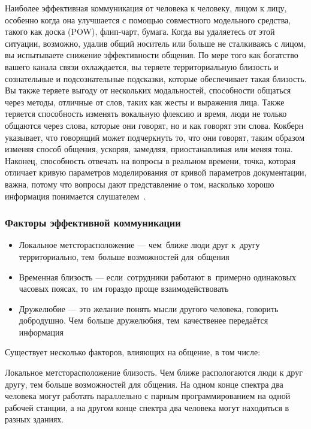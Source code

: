 \documentclass{../industrial-development}
\begin{document}
Наиболее эффективная коммуникация от человека к человеку, лицом к лицу, особенно когда она улучшается с помощью совместного модельного средства, такого как доска (POW), флип-чарт, бумага. Когда вы удаляетесь от этой ситуации, возможно, удалив общий носитель или больше не сталкиваясь с лицом, вы испытываете снижение эффективности общения. По мере того как богатство вашего канала связи охлаждается, вы теряете территориальную близость и сознательные и подсознательные подсказки, которые обеспечивает такая близость. Вы также теряете выгоду от нескольких модальностей, способности общаться через методы, отличные от слов, таких как жесты и выражения лица. Также теряется способность изменять вокальную флексию и время, люди не только общаются через слова, которые они говорят, но и как говорят эти слова. Кокберн указывает, что говорящий может подчеркнуть то, что они говорят, таким образом изменяя способ общения, ускоряя, замедляя, приостанавливая или меняя тона. Наконец, способность отвечать на вопросы в реальном времени, точка, которая отличает кривую параметров моделирования от кривой параметров документации, важна, потому что вопросы дают представление о том, насколько хорошо информация понимается слушателем~\cite{AgileComm}.



\begin{frame} \frametitle{Факторы эффективной коммуникации}
  \begin{itemize}
  \item Локальное метсторасположение --- чем~ближе люди друг к~другу территориально, тем~больше возможностей для~общения
  \item Временная близость --- если~сотрудники работают в~примерно одинаковых часовых поясах, то~им гораздо проще взаимодействовать
  \item Дружелюбие --- это желание понять мысли другого человека, говорить добродушно. Чем~больше дружелюбия, тем~качественее передаётся информация
  \end{itemize}
\end{frame}

\lecturenotes

Существует несколько факторов, влияющих на общение, в том числе:

Локальное метсторасположение близость. Чем ближе распологаются люди к друг другу, тем больше возможностей для общения. На одном конце спектра два человека могут работать параллельно с парным программированием на одной рабочей станции, а на другом конце спектра два человека могут находиться в разных зданиях.
\end{document}
